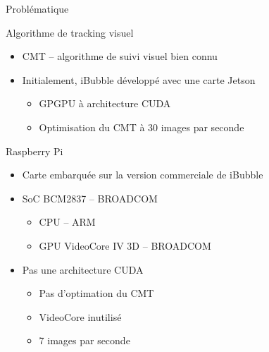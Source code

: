 \documentclass{bredelebeamer}
\begin{document}
\begin{frame}{Problématique}

\begin{block}{Algorithme de tracking visuel}
\begin{itemize}
\item CMT -- algorithme de suivi visuel bien connu
\item Initialement, iBubble développé avec une carte Jetson
\begin{itemize}
\item GPGPU à architecture CUDA
\item Optimisation du CMT à 30 images par seconde
\end{itemize}
\end{itemize}
\end{block}

\begin{block}{Raspberry Pi}
\begin{itemize}
\item Carte embarquée sur la version commerciale de iBubble
\item SoC BCM2837 -- BROADCOM
\begin{itemize}
\item CPU -- ARM
\item GPU VideoCore IV 3D -- BROADCOM
\end{itemize}
\item Pas une architecture CUDA
\begin{itemize}
	\item Pas d'optimation du CMT
	\item VideoCore inutilisé
	\item 7 images par seconde
\end{itemize}
\end{itemize}
\end{block}

\end{frame}

\end{document}
